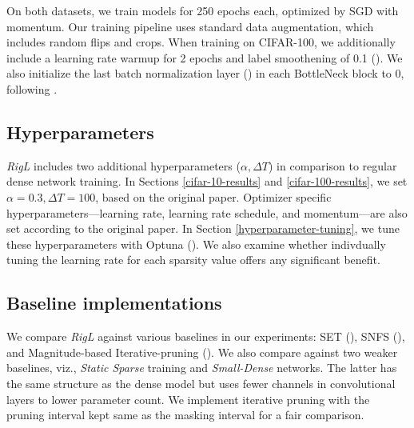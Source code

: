 

On both datasets, we train models for 250 epochs each, optimized by SGD with momentum.  Our training pipeline uses standard data augmentation, which includes random flips and crops. When training on CIFAR-100, we additionally include a learning rate warmup for 2 epochs and label smoothening of 0.1 (\citet{goyal2017accurate}). We also initialize the last batch normalization layer (\citet{ioffe2015batch}) in each BottleNeck block to 0, following \citet{He_2019_CVPR}.

\subsection{Hyperparameters}

\textit{RigL} includes two additional hyperparameters ($\alpha, \Delta T$) in comparison to regular dense network training. In Sections \ref{cifar-10-results} and \ref{cifar-100-results}, we set $\alpha=0.3, \Delta T = 100$, based on the original paper. Optimizer specific hyperparameters---learning rate, learning rate schedule, and momentum---are also set according to the original paper. In Section \ref{hyperparameter-tuning}, we tune these hyperparameters with Optuna (\citet{optuna_2019}). We also examine whether indivdually tuning the learning rate for each sparsity value offers any significant benefit.

\subsection{Baseline implementations}

We compare \textit{RigL} against various baselines in our experiments: SET (\citet{Mocanu2018SET}), SNFS (\citet{dettmers2020sparse}), and Magnitude-based Iterative-pruning (\citet{to_prune_or_not}). We also compare against two weaker baselines, viz., \textit{Static Sparse} training and \textit{Small-Dense} networks. The latter has the same structure as the dense model but uses fewer channels in convolutional layers to lower parameter count. We implement iterative pruning with the pruning interval kept same as the masking interval for a fair comparison. 

